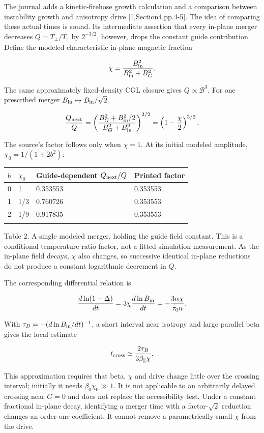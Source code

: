 The journal adds a kinetic-firehose growth calculation and a comparison
between instability growth and anisotropy drive {[}1,Section4,pp.4-5{]}.
The idea of comparing these actual times is sound. Its intermediate
assertion that every in-plane merger decreases \(Q=T_\perp/T_\parallel\)
by \(2^{-3/2}\), however, drops the constant guide contribution. Define
the modeled characteristic in-plane magnetic fraction

\[
\chi=\frac{B_{\rm in}^2}{B_{\rm in}^2+B_G^2}.
\]

The same approximately fixed-density CGL closure gives
\(Q\propto\mathcal B^3\). For one prescribed merger
\(B_{\rm in}\mapsto B_{\rm in}/\sqrt2\),

\[
\frac{Q_{\rm next}}{Q}
=\left(\frac{B_G^2+B_{\rm in}^2/2}{B_G^2+B_{\rm in}^2}\right)^{3/2}
=\left(1-\frac\chi2\right)^{3/2}.
\]

The source's factor follows only when \(\chi=1\). At its initial modeled
amplitude, \(\chi_0=1/(1+2b^2)\):


\begin{minipage}{\linewidth}\small
\begin{tabular}{@{}llll@{}}
\toprule\noalign{}
\(b\) & \(\chi_0\) & Guide-dependent \(Q_{\rm next}/Q\) & Printed
factor \\
\midrule\noalign{}
0 & 1 & 0.353553 & 0.353553 \\
1 & 1/3 & 0.760726 & 0.353553 \\
2 & 1/9 & 0.917835 & 0.353553 \\
\bottomrule\noalign{}
\end{tabular}
\end{minipage}


Table 2. A single modeled merger, holding the guide field constant. This
is a conditional temperature-ratio factor, not a fitted simulation
measurement. As the in-plane field decays, \(\chi\) also changes, so
successive identical in-plane reductions do not produce a constant
logarithmic decrement in \(Q\).

The corresponding differential relation is

\[
\frac{d\ln(1+\Delta)}{dt}
=3\chi\frac{d\ln B_{\rm in}}{dt}
=-\frac{3\alpha\chi}{\tau_0u}.
\]

With \(\tau_B=-(d\ln B_{\rm in}/dt)^{-1}\), a short interval near
isotropy and large parallel beta gives the local estimate

\[
t_{\rm cross}\simeq\frac{2\tau_B}{3\beta_\parallel\chi}.
\]

This approximation requires that beta, \(\chi\) and drive change little
over the crossing interval; initially it needs \(\beta_0\chi_0\gg1\). It
is not applicable to an arbitrarily delayed crossing near \(G=0\) and
does not replace the accessibility test. Under a constant fractional
in-plane decay, identifying a merger time with a factor-\(\sqrt2\)
reduction changes an order-one coefficient. It cannot remove a
parametrically small \(\chi\) from the drive.

